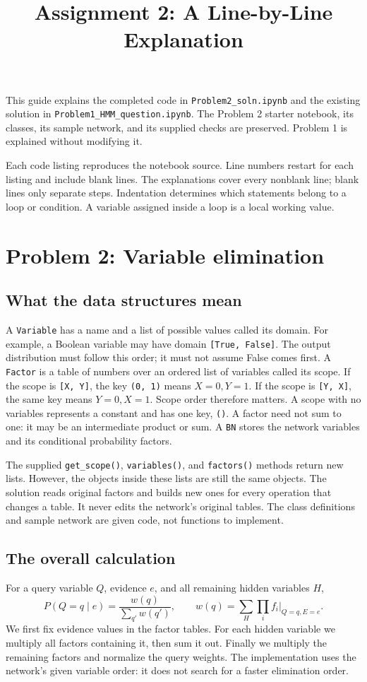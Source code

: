 \documentclass[11pt,a4paper]{article}
\title{Assignment 2: A Line-by-Line Explanation}
\author{}
\date{}
\begin{document}
\maketitle
This guide explains the completed code in \texttt{Problem2\_soln.ipynb}
and the existing solution in \texttt{Problem1\_HMM\_question.ipynb}.
The Problem 2 starter notebook, its classes, its sample network, and its supplied
checks are preserved. Problem 1 is explained without modifying it.

Each code listing reproduces the notebook source. Line numbers restart for each
listing and include blank lines. The explanations cover every nonblank line;
blank lines only separate steps. Indentation determines which statements belong
to a loop or condition. A variable assigned inside a loop is a local working value.
\tableofcontents
\newpage
\section{Problem 2: Variable elimination}
\subsection{What the data structures mean}
A \texttt{Variable} has a name and a list of possible values called its domain.
For example, a Boolean variable may have domain \texttt{[True, False]}.
The output distribution must follow this order; it must not assume False comes first.
A \texttt{Factor} is a table of numbers over an ordered list of variables called
its scope. If the scope is \texttt{[X, Y]}, the key \texttt{(0, 1)} means
\(X=0,Y=1\). If the scope is \texttt{[Y, X]}, the same key means
\(Y=0,X=1\). Scope order therefore matters.
A scope with no variables represents a constant and has one key, \texttt{()}.
A factor need not sum to one: it may be an intermediate product or sum.
A \texttt{BN} stores the network variables and its conditional probability factors.

The supplied \texttt{get\_scope()}, \texttt{variables()}, and \texttt{factors()}
methods return new lists. However, the objects inside these lists are still the
same objects. The solution reads original factors and builds new ones for every
operation that changes a table. It never edits the network's original tables.
The class definitions and sample network are given code, not functions to implement.

\subsection{The overall calculation}
For a query variable \(Q\), evidence \(e\), and all remaining hidden variables \(H\),
\[
P(Q=q\mid e)=\frac{w(q)}{\sum_{q'}w(q')},\qquad
w(q)=\sum_H\prod_i f_i\big|_{Q=q,E=e}.
\]
We first fix evidence values in the factor tables. For each hidden variable we
multiply all factors containing it, then sum it out. Finally we multiply the
remaining factors and normalize the query weights.
The implementation uses the network's given variable order: it does not search
for a faster elimination order.
\end{document}
